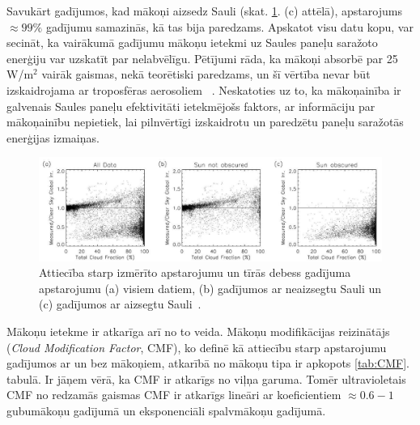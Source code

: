 Savukārt gadījumos, kad mākoņi aizsedz Sauli (skat. \ref{fig:makoni_ietekme}. (c) attēlā), apstarojums $\approx99\%$ gadījumu samazinās, kā tas bija paredzams.
Apskatot visu datu kopu, var secināt, ka vairākumā gadījumu mākoņu ietekmi uz Saules paneļu saražoto enerģiju var uzskatīt par nelabvēlīgu.
Pētījumi rāda, ka mākoņi absorbē par 25 W/m$^2$ vairāk gaismas, nekā teorētiski paredzams, un šī vērtība nevar būt izskaidrojama ar troposfēras aerosoliem ~\cite{observVSModel}. Neskatoties uz to, ka mākoņainība ir galvenais Saules paneļu efektivitāti ietekmējošs faktors, ar informāciju par mākoņainību nepietiek, lai pilnvērtīgi izskaidrotu un paredzētu paneļu saražotās enerģijas izmaiņas.

\begin{figure}[h]
	\centering
	\includegraphics[width=\linewidth]{figures/misc/makoni_ietekme.jpg}
	\caption{Attiecība starp izmērīto apstarojumu un tīrās debess gadījuma apstarojumu (a) visiem datiem, (b) gadījumos ar neaizsegtu Sauli un (c) gadījumos ar aizsegtu Sauli~\cite{CloudCoverageImpactOnIrradiance}.}
	\label{fig:makoni_ietekme}
\end{figure}

Mākoņu ietekme ir atkarīga arī no to veida. Mākoņu modifikācijas reizinātājs (\textit{Cloud Modification Factor}, CMF), ko definē kā attiecību starp apstarojumu gadījumos ar un bez mākoņiem, atkarībā no mākoņu tipa ir apkopots \ref{tab:CMF}. tabulā. Ir jāņem vērā, ka CMF ir atkarīgs no viļņa garuma. Tomēr ultravioletais CMF no redzamās gaismas CMF ir atkarīgs lineāri ar koeficientiem $\approx0.6-1$ gubumākoņu gadījumā un eksponenciāli spalvmākoņu gadījumā.

